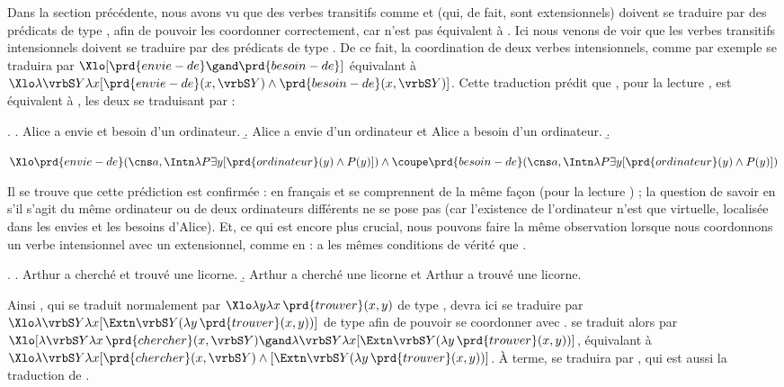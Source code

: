 \medskip

Dans la section précédente, nous avons vu que des verbes transitifs comme  et  (qui, de fait, sont extensionnels) doivent se traduire par des prédicats de type \eet, afin de pouvoir les coordonner correctement, car  n'est pas équivalent à . Ici nous venons de voir que les verbes transitifs intensionnels doivent se traduire par des prédicats de type . %
De ce fait, la coordination de deux verbes intensionnels, comme par exemple  se traduira par \(\Xlo[\prd{envie-de}\gand\prd{besoin-de}]\) équivalant à \(\Xlo\lambda\vrbS Y\lambda x[\prd{envie-de}(x,\vrbS Y)\wedge\prd{besoin-de}(x,\vrbS Y)]\).
Cette traduction prédit que \Next[a], pour la lecture , est équivalent à \Next[b],  les deux se traduisant par \Next[c] :


\ex.
\a. Alice a envie et besoin d'un  ordinateur.
\b. Alice a envie d'un ordinateur et Alice a besoin d'un ordinateur.
\b. \raggedright
\(\Xlo\prd{envie-de}(\cns a,\Intn\lambda P\exists y[\prd{ordinateur}(y) \wedge P(y)]) \wedge \coupe 
\prd{besoin-de}(\cns a,\Intn\lambda P\exists y[\prd{ordinateur}(y) \wedge P(y)])\)


Il se trouve que cette prédiction est confirmée : en français \Last[a] et \Last[b] se comprennent de la même façon (pour la lecture ) ; la question de savoir en \Last[b] s'il s'agit du même ordinateur ou de deux ordinateurs différents ne se pose pas (car l'existence de l'ordinateur n'est que virtuelle, localisée dans les envies et les besoins d'Alice).  
Et, ce qui est encore plus crucial, nous pouvons faire la même observation lorsque nous coordonnons un verbe intensionnel avec un extensionnel, comme en {\Next} : \Next[a] a les mêmes conditions de vérité que \Next[b]. 


\ex.
\a. Arthur a cherché et trouvé une licorne.
\b. Arthur a cherché une licorne et Arthur a trouvé une licorne.


\sloppy

Ainsi , qui se traduit normalement par $\Xlo\lambda y\lambda x\,\prd{trouver}(x,y)$ de type \eet, devra ici se traduire par $\Xlo\lambda\vrbS Y\lambda x[\Extn\vrbS Y(\lambda y\,\prd{trouver}(x,y))]$  de type 
 afin de pouvoir se coordonner avec .
 se traduit alors par
$\Xlo[\lambda\vrbS Y\lambda x\,\prd{chercher}(x,\vrbS Y) \gand \lambda\vrbS Y\lambda x[\Extn\vrbS Y(\lambda y\,\prd{trouver}(x,y))]$, équivalant à 
$\Xlo\lambda\vrbS Y\lambda x[\prd{chercher}(x,\vrbS Y) \wedge [\Extn\vrbS Y(\lambda y\,\prd{trouver}(x,y))]$.
À terme, \Last[a] se traduira par \Next, qui est aussi la traduction de \Last[b].

